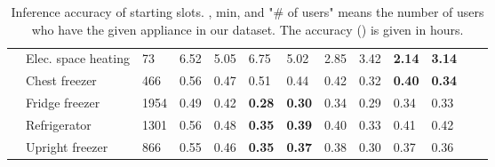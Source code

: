 \documentclass[11pt,a4paper]{article}
\theoremstyle{plain}
\theoremstyle{plain}
\theoremstyle{plain}
\theoremstyle{plain}
\theoremstyle{nonumberplain} \theoremseparator{}
\begin{document}
\begin{table*}
\begin{tabular}{|c|l|l|l|l|l|l|l|l|l|l|l|l|}
  \cline{2-11}

&  Elec. space heating  & 73 & 6.52 & 5.05 & 6.75 & 5.02 & 2.85 & 3.42 & \textbf{2.14} & \textbf{3.14}\\ 
  \cline{2-11}

&   Chest freezer  & 466 & 0.56 & 0.47 & 0.51 & 0.44 & 0.42 & 0.32 & \textbf{0.40} & \textbf{0.34}\\
  \cline{2-11}

&  Fridge freezer  & 1954 & 0.49 & 0.42 & \textbf{0.28} & \textbf{0.30} & 0.34 & 0.29 & 0.34 & 0.33\\ 

  \cline{2-11}

&  Refrigerator  & 1301 & 0.56 & 0.48 & \textbf{0.35}& \textbf{0.39} & 0.40 & 0.33 & 0.41 & 0.42\\ 
  \cline{2-11}

&  Upright freezer  & 866 & 0.55 & 0.46 & \textbf{0.35} & \textbf{0.37} & 0.38 & 0.30 & 0.37 & 0.36\\ 
 \hline
\hline

\end{tabular}
\caption{Inference accuracy of starting slots. ,  min, and "\# of users" means the number of users who 
have the given appliance in our dataset. The accuracy () is given in hours.}
\label{tab:devices2}
\end{table*}
\end{document}
